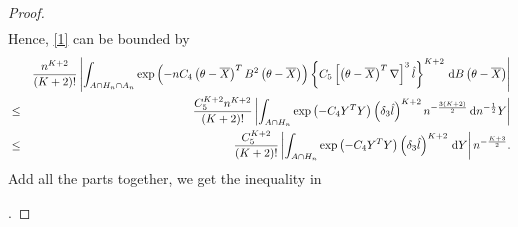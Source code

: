 \begin{proof}
\begin{eqnarray*}
\end{eqnarray*}
Hence, \eqref{1} can be bounded by 
\begin{eqnarray*}
 &  & \frac{n^{K+2}}{\left(K+2\right)!}\left|\int_{A\cap H_{n}\cap A_{n}}\exp\left(-nC_{4}\left(\theta-\overline{X}\right)^{T}B^{2}\left(\theta-\overline{X}\right)\right)\left\{ C_{5}\left[\left(\theta-\overline{X}\right)^{T}\nabla\right]^{3}\hat{l}\right\} ^{K+2}\,\mathrm{d} B\left(\theta-\overline{X}\right)\right|\\
 & \le & \frac{C_{5}^{K+2}n^{K+2}}{\left(K+2\right)!}\left|\int_{A\cap H_{n}}\exp\left(-C_{4}Y^{T}Y\right)\left(\delta_{3}\hat{l}\right)^{K+2}n^{-\frac{3\left(K+2\right)}{2}}\,\mathrm{d} n^{-\frac{1}{2}}Y\right|\\
 & \le & \frac{C_{5}^{K+2}}{\left(K+2\right)!}\left|\int_{A\cap H_{n}}\exp\left(-C_{4}Y^{T}Y\right)\left(\delta_{3}\hat{l}\right)^{K+2}\,\mathrm{d} Y\right|n^{-\frac{K+3}{2}}.
\end{eqnarray*}
Add all the parts together, we get the inequality in %
\begin{comment}
add ref to main theorem
\end{comment}
.
\end{proof}


